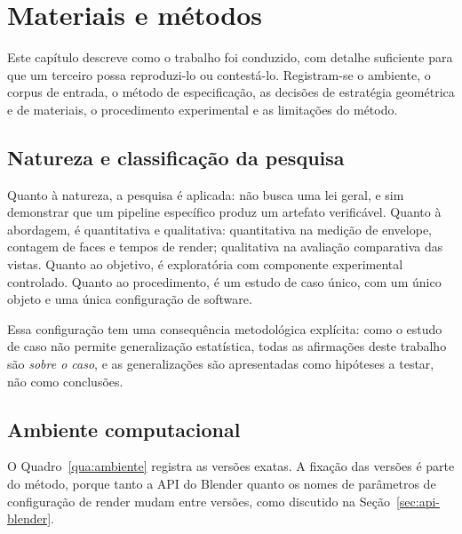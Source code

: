 \chapter{Materiais e m\'etodos}\label{ch:metodos}

Este cap\'itulo descreve como o trabalho foi conduzido, com detalhe suficiente para que um
terceiro possa reproduzi-lo ou contest\'a-lo. Registram-se o ambiente, o corpus de entrada, o
m\'etodo de especifica{\c{c}}\~ao, as decis\~oes de estrat\'egia geom\'etrica e de materiais, o
procedimento experimental e as limita{\c{c}}\~oes do m\'etodo.

\section{Natureza e classifica{\c{c}}\~ao da pesquisa}

Quanto \`a natureza, a pesquisa \'e aplicada: n\~ao busca uma lei geral, e sim demonstrar que um
pipeline espec\'ifico produz um artefato verific\'avel. Quanto \`a abordagem, \'e quantitativa
e qualitativa: quantitativa na medi{\c{c}}\~ao de envelope, contagem de faces e tempos de
render; qualitativa na avalia{\c{c}}\~ao comparativa das vistas. Quanto ao objetivo, \'e
explorat\'oria com componente experimental controlado. Quanto ao procedimento, \'e um estudo de
caso \'unico, com um \'unico objeto e uma \'unica configura{\c{c}}\~ao de software.

Essa configura{\c{c}}\~ao tem uma consequ\^encia metodol\'ogica expl\'icita: como o estudo de caso
n\~ao permite generaliza{\c{c}}\~ao estat\'istica, todas as afirma{\c{c}}\~oes deste trabalho
s\~ao \emph{sobre o caso}, e as generaliza{\c{c}}\~oes s\~ao apresentadas como hip\'oteses a
testar, n\~ao como conclus\~oes.

\section{Ambiente computacional}

O Quadro~\ref{qua:ambiente} registra as vers\~oes exatas. A fixa{\c{c}}\~ao das vers\~oes \'e
parte do m\'etodo, porque tanto a API do Blender quanto os nomes de par\^ametros de
configura{\c{c}}\~ao de render mudam entre vers\~oes, como discutido na
Se{\c{c}}\~ao~\ref{sec:api-blender}.

